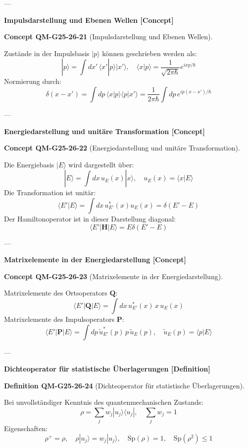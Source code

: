 \documentclass[10pt, letterpaper]{article}
\newcommand{\CustomHeading}[3]{%
  \par\medskip\noindent%
  \textbf{#1 #2} \textnormal{(#3)}.\enskip%
}
\newenvironment{DEF}[2]{\begin{unitbox}\CustomHeading{Definition}{#1}{#2}}{\end{unitbox}}
\newenvironment{CONC}[2]{\begin{unitbox}\CustomHeading{Concept}{#1}{#2}}{\end{unitbox}}
\begin{document}
---

\textbf{Impulsdarstellung und Ebenen Wellen [Concept]}

\begin{CONC}{QM-G25-26-21}{Impulsdarstellung und Ebenen Wellen}
Zustände in der Impulsbasis $|p\rangle$ können geschrieben werden als:
\[
|p\rangle = \int dx'\, \langle x' | p \rangle |x'\rangle, \quad \langle x | p \rangle = \frac{1}{\sqrt{2\pi\hbar}} e^{ixp/\hbar}
\]
Normierung durch:
\[
\delta(x - x') = \int dp\, \langle x | p \rangle \langle p | x' \rangle = \frac{1}{2\pi\hbar} \int dp\, e^{ip(x - x')/\hbar}
\]
\end{CONC}

---

\textbf{Energiedarstellung und unitäre Transformation [Concept]}

\begin{CONC}{QM-G25-26-22}{Energiedarstellung und unitäre Transformation}
Die Energiebasis $|E\rangle$ wird dargestellt über:
\[
|E\rangle = \int dx\, u_E(x) |x\rangle, \quad u_E(x) = \langle x | E \rangle
\]
Die Transformation ist unitär:
\[
\langle E' | E \rangle = \int dx\, u_{E'}^*(x) u_E(x) = \delta(E' - E)
\]
Der Hamiltonoperator ist in dieser Darstellung diagonal:
\[
\langle E' | \mathbf{H} | E \rangle = E \delta(E' - E)
\]
\end{CONC}

---

\textbf{Matrixelemente in der Energiedarstellung [Concept]}

\begin{CONC}{QM-G25-26-23}{Matrixelemente in der Energiedarstellung}
Matrixelemente des Ortsoperators $\mathbf{Q}$:
\[
\langle E' | \mathbf{Q} | E \rangle = \int dx\, u_{E'}^*(x)\, x\, u_E(x)
\]
Matrixelemente des Impulsoperators $\mathbf{P}$:
\[
\langle E' | \mathbf{P} | E \rangle = \int dp\, \tilde{u}_{E'}^*(p)\, p\, \tilde{u}_E(p), \quad \tilde{u}_E(p) = \langle p | E \rangle
\]
\end{CONC}

---

\textbf{Dichteoperator für statistische Überlagerungen [Definition]}

\begin{DEF}{QM-G25-26-24}{Dichteoperator für statistische Überlagerungen}
Bei unvollständiger Kenntnis des quantenmechanischen Zustands:
\[
\rho = \sum_j w_j |u_j\rangle\langle u_j|, \quad \sum_j w_j = 1
\]
Eigenschaften:
\[
\rho^+ = \rho, \quad \rho |u_j\rangle = w_j |u_j\rangle, \quad \text{Sp}(\rho) = 1, \quad \text{Sp}(\rho^2) \leq 1
\]
\end{DEF}
\end{document}
